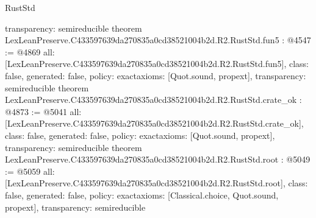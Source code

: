 \begin{lexlean}{RustStd}
\begin{coremodule}
{  transparency: semireducible
}
theorem LexLeanPreserve.C433597639da270835a0cd38521004b2d.R2.RustStd.fun5 : @4547 := @4869 {
  all: [LexLeanPreserve.C433597639da270835a0cd38521004b2d.R2.RustStd.fun5],
  class: false,
  generated: false,
  policy: exact{axioms: [Quot.sound, propext]},
  transparency: semireducible
}
theorem LexLeanPreserve.C433597639da270835a0cd38521004b2d.R2.RustStd.crate_ok : @4873 := @5041 {
  all: [LexLeanPreserve.C433597639da270835a0cd38521004b2d.R2.RustStd.crate_ok],
  class: false,
  generated: false,
  policy: exact{axioms: [Quot.sound, propext]},
  transparency: semireducible
}
theorem LexLeanPreserve.C433597639da270835a0cd38521004b2d.R2.RustStd.root : @5049 := @5059 {
  all: [LexLeanPreserve.C433597639da270835a0cd38521004b2d.R2.RustStd.root],
  class: false,
  generated: false,
  policy: exact{axioms: [Classical.choice, Quot.sound, propext]},
  transparency: semireducible
}


\end{coremodule}
\end{lexlean}
